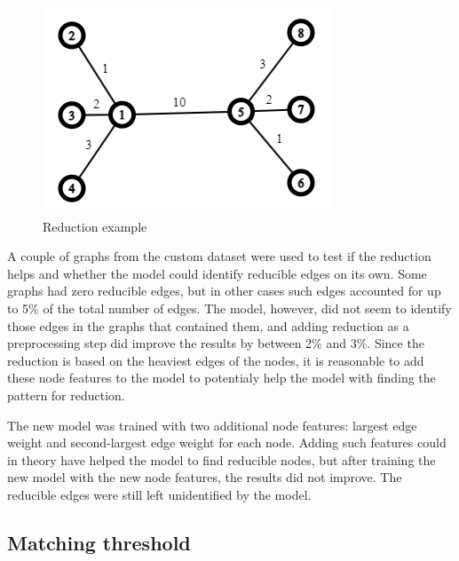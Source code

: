 \begin{figure}[H]
    \centering
    \includegraphics[scale=1.0]{figures/ReductionExample}
    \caption{Reduction example}
    \label{Reduction example}
\end{figure}

A couple of graphs from the custom dataset were used to test if the reduction helps and whether the model could identify reducible edges on its own. Some graphs had zero reducible edges, but in other cases such edges accounted for up to 5\% of the total number of edges. The model, however, did not seem to identify those edges in the graphs that contained them, and adding reduction as a preprocessing step did improve the results by between 2\% and 3\%. Since the reduction is based on the heaviest edges of the nodes, it is reasonable to add these node features to the model to potentialy help the model with finding the pattern for reduction. 

The new model was trained with two additional node features: largest edge weight and second-largest edge weight for each node. Adding such features could in theory have helped the model to find reducible nodes, but after training the new model with the new node features, the results did not improve. The reducible edges were still left unidentified by the model.

\subsection{Matching threshold}

